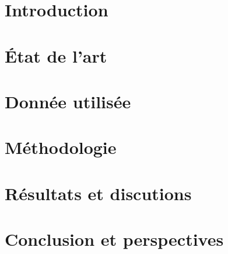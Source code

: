 \documentclass[11pt,a4paper]{memoir}
\begin{document}

\nocite{*}
\titlelabel{\thetitle\quad}
\renewcommand{\contentsname}{Sommaire}
\renewcommand{\tablename}{Tableau}
\tableofcontents
\setcounter{tocdepth}{3}
\setcounter{secnumdepth}{3}
\listoftables
\listoffigures
\chapter{Introduction}

\chapter{État de l'art}

\chapter{Donnée utilisée}


\chapter{Méthodologie}

\chapter{Résultats et discutions}
\chapter{Conclusion et perspectives}




\end{document}
